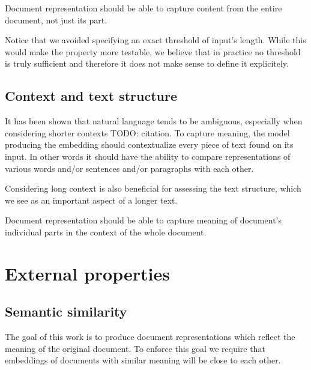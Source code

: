 \begin{repre_prop}\label{repre_prop:long-inputs}

  Document representation should be able to capture content from the entire
  document, not just its part.

\end{repre_prop}

Notice that we avoided specifying an exact threshold of input's length. While
this would make the property more testable, we believe that in practice no
threshold is truly sufficient and therefore it does not make sense to define it
explicitely.

\subsection{Context and text structure}

It has been shown that natural language tends to be ambiguous, especially when considering
shorter contexts TODO: citation. To capture meaning, the model producing the
embedding should contextualize every piece of text found on its input. In other
words it should have the ability to compare representations of various words
and/or sentences and/or paragraphs with each other.

Considering long context is also beneficial for assessing the text structure,
which we see as an important aspect of a longer text.

\begin{repre_prop}\label{repre_prop:contextualized-inputs}

  Document representation should be able to capture meaning of document's
  individual parts in the context of the whole document.

\end{repre_prop}

\section{External properties}

\subsection{Semantic similarity}

The goal of this work is to produce document representations which reflect the
meaning of the original document. To enforce this goal we require that
embeddings of documents with similar meaning will be close to each other.

